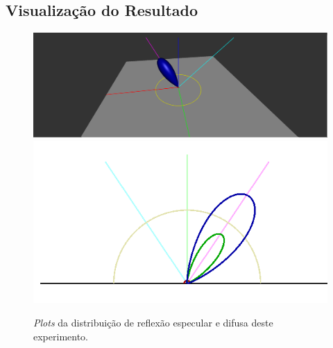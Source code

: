 \subsection{Visualização do Resultado}
\begin{figure}[H]
    \caption{\small{\textit{Plots} da distribuição de reflexão especular e difusa deste experimento.}}
    \label{fig-cook-torrance-plots}
    \vspace{42px}
  \includegraphics[width=\linewidth]{./Imagens/brdfs/cook-torrance-3D-plot}
\endminipage\hfill
{}
  \includegraphics[width=\linewidth]{./Imagens/brdfs/cook-torrance-polar-plot-log.png}
\endminipage\hfill
\end{figure}

